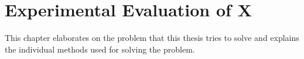 \chapter{Experimental Evaluation of X \label{cha:chapter3}}

This chapter elaborates on the problem that this thesis tries to solve and explains the individual methods used for solving the problem. 
